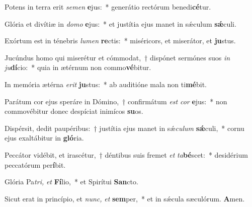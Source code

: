 \item Potens in terra erit \textit{semen} \textbf{e}jus:~* generátio rectórum benedi\textbf{cé}tur.
\item Glória et divítiæ in \textit{domo} \textbf{e}jus:~* et justítia ejus manet in sǽculum \textbf{sǽ}culi.
\item Exórtum est in ténebris \textit{lumen} \textbf{re}ctis:~* miséricors, et miserátor, et \textbf{ju}stus.
\item Jucúndus homo qui miserétur et cómmodat,~† dispónet sermónes suos \textit{in} \textit{ju}\textbf{dí}cio:~* quia in ætérnum non commo\textbf{vé}bitur.
\item In memória ætérna \textit{erit} \textbf{ju}stus:~* ab auditióne mala non ti\textbf{mé}bit.
\item Parátum cor ejus speráre in Dómino,~† confirmátum \textit{est} \textit{cor} \textbf{e}jus:~* non commovébitur donec despíciat inimícos \textbf{su}os.
\item Dispérsit, dedit paupéribus:~† justítia ejus manet in sǽ\tinyhspace\textit{culum} \textbf{sǽ}culi,~* cornu ejus exaltábitur in \textbf{gló}ria.
\item Peccátor vidébit, et irascétur,~† déntibus suis fremet \textit{et} \textit{ta}\textbf{bé}scet:~* desidérium peccatórum per\textbf{í}bit.
\item Glória Pa\tinyhspace\textit{tri,} \textit{et} \textbf{Fí}lio,~* et Spirítui \textbf{San}cto.
\item Sicut erat in princípio, et \textit{nunc,} \textit{et} \textbf{sem}per,~* et in sǽcula sæculórum. \textbf{A}men.

